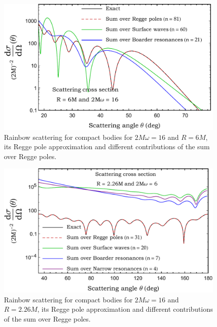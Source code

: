 \documentclass[aps,prd,longbibliography,reprint,twocolumn,amsmath,amssymb,amsfonts,showpacs,superscriptaddress]{revtex4-1}%
\begin{document}
\begin{figure}%
\centering
 \includegraphics[scale=0.50]{Rainbow_Cross_Section_R_6_2Mw_16}
\caption{\label{S_0_2Mw_06_Exact_vs_CAM} Rainbow scattering for compact bodies for $2M\omega=16$ and $R=6M$, its Regge pole approximation and different contributions of the sum over Regge poles.}
\end{figure}


\begin{figure}%
\centering
 \includegraphics[scale=0.50]{Diff_Contribution_Cross_Section_R_2-dot-26_2Mw_6}
\caption{\label{S_0_2Mw_06_Exact_vs_CAM} Rainbow scattering for compact bodies for $2M\omega=16$ and $R=2.26M$, its Regge pole approximation and different contributions of the sum over Regge poles.}
\end{figure}
\end{document}
